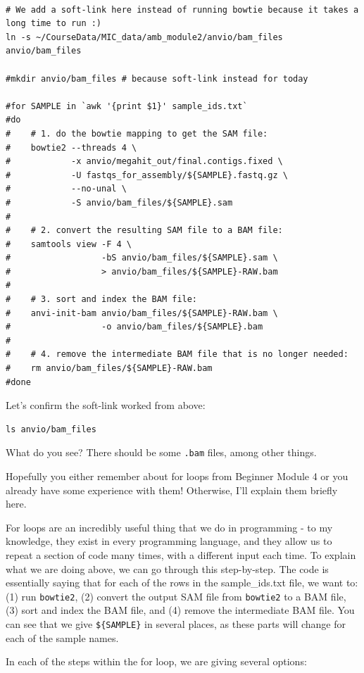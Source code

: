 \documentclass[
]{book}
\begin{document}
\begin{verbatim}

# We add a soft-link here instead of running bowtie because it takes a long time to run :)
ln -s ~/CourseData/MIC_data/amb_module2/anvio/bam_files anvio/bam_files

#mkdir anvio/bam_files # because soft-link instead for today

#for SAMPLE in `awk '{print $1}' sample_ids.txt`
#do
#    # 1. do the bowtie mapping to get the SAM file:
#    bowtie2 --threads 4 \
#            -x anvio/megahit_out/final.contigs.fixed \
#            -U fastqs_for_assembly/${SAMPLE}.fastq.gz \
#            --no-unal \
#            -S anvio/bam_files/${SAMPLE}.sam
#
#    # 2. convert the resulting SAM file to a BAM file:
#    samtools view -F 4 \
#                  -bS anvio/bam_files/${SAMPLE}.sam \
#                  > anvio/bam_files/${SAMPLE}-RAW.bam
#    
#    # 3. sort and index the BAM file:
#    anvi-init-bam anvio/bam_files/${SAMPLE}-RAW.bam \
#                  -o anvio/bam_files/${SAMPLE}.bam
#    
#    # 4. remove the intermediate BAM file that is no longer needed:
#    rm anvio/bam_files/${SAMPLE}-RAW.bam
#done
\end{verbatim}

Let's confirm the soft-link worked from above:

\begin{verbatim}
ls anvio/bam_files
\end{verbatim}

What do you see? There should be some \texttt{.bam} files, among other things.

Hopefully you either remember about for loops from Beginner Module 4 or you already have some experience with them! Otherwise, I'll explain them briefly here.

For loops are an incredibly useful thing that we do in programming - to my knowledge, they exist in every programming language, and they allow us to repeat a section of code many times, with a different input each time. To explain what we are doing above, we can go through this step-by-step. The code is essentially saying that for each of the rows in the sample\_ids.txt file, we want to: (1) run \texttt{bowtie2}, (2) convert the output SAM file from \texttt{bowtie2} to a BAM file, (3) sort and index the BAM file, and (4) remove the intermediate BAM file. You can see that we give \texttt{\$\{SAMPLE\}} in several places, as these parts will change for each of the sample names.

In each of the steps within the for loop, we are giving several options:
\end{document}
